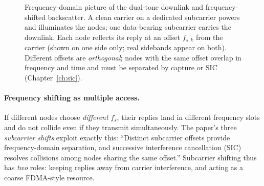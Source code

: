 \begin{figure}[t]
\centering
{}
\caption{Frequency-domain picture of the dual-tone downlink and frequency-shifted backscatter. A clean carrier on a dedicated subcarrier powers and illuminates the nodes; one data-bearing subcarrier carries the downlink. Each node reflects its reply at an offset $f_{s,k}$ from the carrier (shown on one side only; real sidebands appear on both). Different offsets are \emph{orthogonal}; nodes with the same offset overlap in frequency and time and must be separated by capture or SIC (Chapter~\ref{ch:sic}).}
\label{fig:spectrum}
\end{figure}

\paragraph{Frequency shifting as multiple access.}
If different nodes choose \emph{different} $f_s$, their replies land in different
frequency slots and do not collide even if they transmit simultaneously. The
paper's three \emph{subcarrier shifts} exploit exactly this: ``Distinct subcarrier
offsets provide frequency-domain separation, and successive interference
cancellation (SIC) resolves collisions among nodes sharing the same offset.''
Subcarrier shifting thus has \emph{two} roles: keeping replies away from carrier
interference, and acting as a coarse FDMA-style resource.

